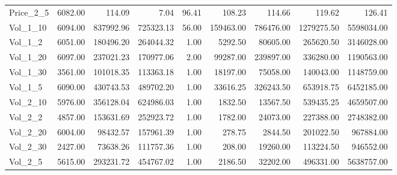 \begin{table}
\begin{tabular}{lrrrrrrrr}
Price_2_5 & 6082.00 & 114.09 & 7.04 & 96.41 & 108.23 & 114.66 & 119.62 & 126.41 \\
Vol_1_10 & 6094.00 & 837992.96 & 725323.13 & 56.00 & 159463.00 & 786476.00 & 1279275.50 & 5598034.00 \\
Vol_1_2 & 6051.00 & 180496.20 & 264044.32 & 1.00 & 5292.50 & 80605.00 & 265620.50 & 3146028.00 \\
Vol_1_20 & 6097.00 & 237021.23 & 170977.06 & 2.00 & 99287.00 & 239897.00 & 336280.00 & 1190563.00 \\
Vol_1_30 & 3561.00 & 101018.35 & 113363.18 & 1.00 & 18197.00 & 75058.00 & 140043.00 & 1148759.00 \\
Vol_1_5 & 6090.00 & 430743.53 & 489702.20 & 1.00 & 33616.25 & 326243.50 & 653918.75 & 6452185.00 \\
Vol_2_10 & 5976.00 & 356128.04 & 624986.03 & 1.00 & 1832.50 & 13567.50 & 539435.25 & 4659507.00 \\
Vol_2_2 & 4857.00 & 153631.69 & 252923.72 & 1.00 & 1782.00 & 24073.00 & 227388.00 & 2748382.00 \\
Vol_2_20 & 6004.00 & 98432.57 & 157961.39 & 1.00 & 278.75 & 2844.50 & 201022.50 & 967884.00 \\
Vol_2_30 & 2427.00 & 73638.26 & 111757.36 & 1.00 & 208.00 & 19260.00 & 113224.50 & 946552.00 \\
Vol_2_5 & 5615.00 & 293231.72 & 454767.02 & 1.00 & 2186.50 & 32202.00 & 496331.00 & 5638757.00 \\
\bottomrule
\end{tabular}
\end{table}
